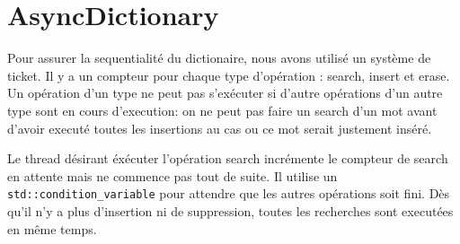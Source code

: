 \documentclass{article}
\begin{document}
\section{AsyncDictionary}
Pour assurer la sequentialité du dictionaire, nous avons utilisé un système de ticket. Il y a un compteur pour chaque type d'opération : search, insert et erase. Un opération d'un type ne peut pas s'exécuter si d'autre opérations d'un autre type sont en cours d'execution: on ne peut pas faire un search d'un mot avant d'avoir executé toutes les insertions au cas ou ce mot serait justement inséré.

Le thread désirant éxécuter l'opération search incrémente le compteur de search en attente mais ne commence pas tout de suite. Il utilise un \texttt{std::condition\_variable} pour attendre que les autres opérations soit fini. Dès qu'il n'y a plus d'insertion ni de suppression, toutes les recherches sont executées en même temps.
\end{document}
